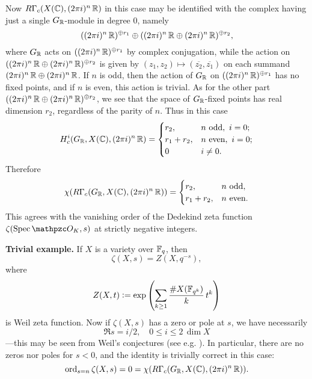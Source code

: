 \begin{nameless}
  Now $R\Gamma_c (X (\mathbb{C}), (2\pi i)^n\,\mathbb{R})$ in this case may be identified with
  the complex having just a single $G_{\mathbb{R}}$-module in degree $0$, namely
  \[ ((2\pi i)^n\,\mathbb{R})^{\oplus r_1}
    \oplus
    ((2\pi i)^n\,\mathbb{R} \oplus (2\pi i)^n\,\mathbb{R})^{\oplus r_2}, \]
  where $G_{\mathbb{R}}$ acts on $((2\pi i)^n\,\mathbb{R})^{\oplus r_1}$ by complex conjugation,
  while the action on $((2\pi i)^n\,\mathbb{R} \oplus (2\pi i)^n\,\mathbb{R})^{\oplus r_2}$ is
  given by $(z_1,z_2) \mapsto (\overline{z_2}, \overline{z_1})$ on each summand
  $(2\pi i)^n\,\mathbb{R} \oplus (2\pi i)^n\,\mathbb{R}$. If $n$ is odd, then the action of
  $G_{\mathbb{R}}$ on $((2\pi i)^n\,\mathbb{R})^{\oplus r_1}$ has no fixed points, and if $n$ is
  even, this action is trivial. As for the other part
  $((2\pi i)^n\,\mathbb{R} \oplus (2\pi i)^n\,\mathbb{R})^{\oplus r_2}$, we see that the space
  of $G_{\mathbb{R}}$-fixed points has real dimension $r_2$, regardless of the parity of
  $n$. Thus in this case
  \[ H^i_c (G_{\mathbb{R}}, X (\mathbb{C}), (2\pi i)^n\,\mathbb{R}) =
    \begin{cases}
      r_2, & n \text{ odd}, ~ i = 0;\\
      r_1 + r_2, & n \text{ even}, ~ i = 0;\\
      0 & i \ne 0.
    \end{cases} \]
  Therefore
  \[ \chi (R\Gamma_c (G_{\mathbb{R}}, X (\mathbb{C}), (2\pi i)^n\,\mathbb{R})) =
    \begin{cases}
      r_2, & n \text{ odd}, \\
      r_1 + r_2, & n \text{ even}.
    \end{cases} \]
  This agrees with the vanishing order of the Dedekind zeta function
  $\zeta (\Spec \O_K, s)$ at strictly negative integers.
\end{nameless}

\begin{nameless}\textbf{Trivial example.}
  If $X$ is a variety over $\mathbb{F}_q$, then
  $$\zeta (X,s) = Z (X, q^{-s}),$$
  where
  $$Z (X,t) \mathrel{\mathop:}= \exp \left(\sum_{k\ge 1} \frac{\# X (\mathbb{F}_{q^k})}{k}\,t^k\right)$$
  is Weil zeta function. Now if $\zeta (X,s)$ has a zero or pole at $s$, we have
  necessarily
  $$\Re s = i/2, \quad 0 \le i \le 2\,\dim X$$
  ---this may be seen from Weil's conjectures
  (see e.g. \cite[p. 26--27]{Katz-Motives}). In particular, there are no zeros
  nor poles for $s < 0$, and the identity
   is trivially
  correct in this case:
  \[ \operatorname{ord}_{s=n} \zeta (X,s) = 0 =
    \chi (R\Gamma_c (G_{\mathbb{R}}, X (\mathbb{C}), (2\pi i)^n\,\mathbb{R})). \]
\end{nameless}

